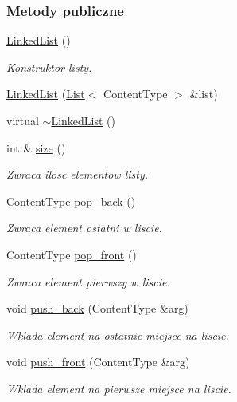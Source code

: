 \subsubsection*{Metody publiczne}
\begin{DoxyCompactItemize}
\item 
\hyperlink{class_linked_list_a7528caae708f987831abf7ae722b5f18}{Linked\-List} ()
\begin{DoxyCompactList}\small\item\em Konstruktor listy. \end{DoxyCompactList}\item 
\hyperlink{class_linked_list_a9819b4a94bea2ee29f424ae3192a0078}{Linked\-List} (\hyperlink{class_list}{List}$<$ Content\-Type $>$ \&list)
\item 
virtual \hyperlink{class_linked_list_ae0e04b65a2b2327a53db60fe2957063b}{$\sim$\-Linked\-List} ()
\item 
int \& \hyperlink{class_linked_list_ab399f1dc929c705e9cba628ae1f29254}{size} ()
\begin{DoxyCompactList}\small\item\em Zwraca ilosc elementow listy. \end{DoxyCompactList}\item 
Content\-Type \hyperlink{class_linked_list_ad7634e21b0ccd370906c4f28baaffa38}{pop\-\_\-back} ()
\begin{DoxyCompactList}\small\item\em Zwraca element ostatni w liscie. \end{DoxyCompactList}\item 
Content\-Type \hyperlink{class_linked_list_a64abea886f0dadf69a3726d1880c514a}{pop\-\_\-front} ()
\begin{DoxyCompactList}\small\item\em Zwraca element pierwszy w liscie. \end{DoxyCompactList}\item 
void \hyperlink{class_linked_list_a719c7b47925171fd7a72a35d0a581619}{push\-\_\-back} (Content\-Type \&arg)
\begin{DoxyCompactList}\small\item\em Wklada element na ostatnie miejsce na liscie. \end{DoxyCompactList}\item 
void \hyperlink{class_linked_list_a9effa3698ad28e2f3401cd199f852e08}{push\-\_\-front} (Content\-Type \&arg)
\begin{DoxyCompactList}\small\item\em Wklada element na pierwsze miejsce na liscie. \end{DoxyCompactList}\item 

\end{DoxyCompactItemize}
